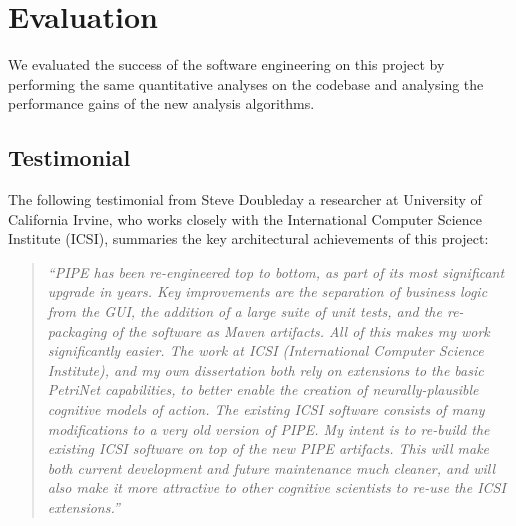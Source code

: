 \section{Evaluation}
We evaluated the success of the software engineering on this project by performing the same quantitative analyses on the codebase and analysing the performance gains of the new analysis algorithms.






\subsection{Testimonial}
The following testimonial from Steve Doubleday a researcher at University of California Irvine, who works closely with the International Computer Science Institute (ICSI), summaries the key architectural achievements of this project:

\begin{quote}
    \textit{``PIPE has been re-engineered top to bottom, as part of its most significant upgrade in years. Key improvements are the separation of business logic from the GUI, the addition of a large suite of unit tests, and the re-packaging of the software as Maven artifacts.  All of this makes my work significantly easier. The work at ICSI (International Computer Science Institute), and my own dissertation both rely on extensions to the basic PetriNet capabilities, to better enable the creation of neurally-plausible cognitive models of action. The existing ICSI software consists of many modifications to a very old version of PIPE. My intent is to re-build the existing ICSI software on top of the new PIPE artifacts. This will make both current development and future maintenance much cleaner, and will also make it more attractive to other cognitive scientists to re-use the ICSI extensions.''}
\end{quote}
